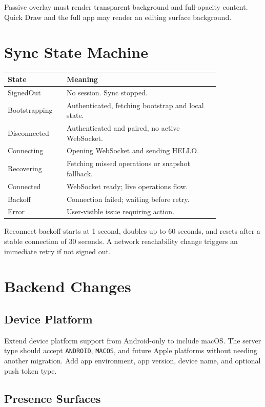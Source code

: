 \documentclass[11pt]{article}
\begin{document}
Passive overlay must render transparent background and full-opacity content. Quick Draw and the full app may render an editing surface background.

\section{Sync State Machine}

\begin{longtable}{p{0.2\linewidth} p{0.62\linewidth}}
\toprule
\textbf{State} & \textbf{Meaning} \\
\midrule
SignedOut & No session. Sync stopped. \\
Bootstrapping & Authenticated, fetching bootstrap and local state. \\
Disconnected & Authenticated and paired, no active WebSocket. \\
Connecting & Opening WebSocket and sending HELLO. \\
Recovering & Fetching missed operations or snapshot fallback. \\
Connected & WebSocket ready; live operations flow. \\
Backoff & Connection failed; waiting before retry. \\
Error & User-visible issue requiring action. \\
\bottomrule
\end{longtable}

Reconnect backoff starts at 1 second, doubles up to 60 seconds, and resets after a stable connection of 30 seconds. A network reachability change triggers an immediate retry if not signed out.

\section{Backend Changes}

\subsection{Device Platform}

Extend device platform support from Android-only to include macOS. The server type should accept \texttt{ANDROID}, \texttt{MACOS}, and future Apple platforms without needing another migration. Add app environment, app version, device name, and optional push token type.

\subsection{Presence Surfaces}
\end{document}
